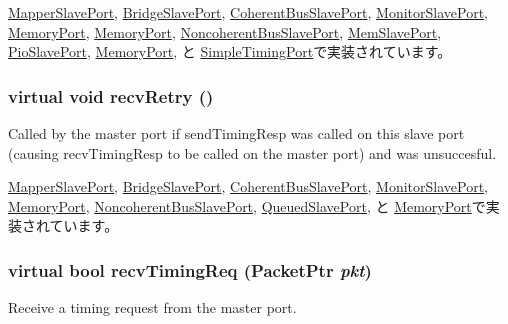 \hyperlink{classAddrMapper_1_1MapperSlavePort_aeefa907fb6d6a787e6dab90e8138ea90}{MapperSlavePort}, \hyperlink{classBridge_1_1BridgeSlavePort_aeefa907fb6d6a787e6dab90e8138ea90}{BridgeSlavePort}, \hyperlink{classCoherentBus_1_1CoherentBusSlavePort_a914924599c231593833dd1d527b4bb7c}{CoherentBusSlavePort}, \hyperlink{classCommMonitor_1_1MonitorSlavePort_aeefa907fb6d6a787e6dab90e8138ea90}{MonitorSlavePort}, \hyperlink{classDRAMCtrl_1_1MemoryPort_aeefa907fb6d6a787e6dab90e8138ea90}{MemoryPort}, \hyperlink{classDRAMSim2_1_1MemoryPort_aeefa907fb6d6a787e6dab90e8138ea90}{MemoryPort}, \hyperlink{classNoncoherentBus_1_1NoncoherentBusSlavePort_a914924599c231593833dd1d527b4bb7c}{NoncoherentBusSlavePort}, \hyperlink{classRubyPort_1_1MemSlavePort_aeefa907fb6d6a787e6dab90e8138ea90}{MemSlavePort}, \hyperlink{classRubyPort_1_1PioSlavePort_aeefa907fb6d6a787e6dab90e8138ea90}{PioSlavePort}, \hyperlink{classSimpleMemory_1_1MemoryPort_aeefa907fb6d6a787e6dab90e8138ea90}{MemoryPort}, と \hyperlink{classSimpleTimingPort_aeefa907fb6d6a787e6dab90e8138ea90}{SimpleTimingPort}で実装されています。\hypertarget{classSlavePort_ac1ccc3bcf7ebabb20b57fab99b2be5b0}{
\subsubsection[{recvRetry}]{\setlength{\rightskip}{0pt plus 5cm}virtual void recvRetry ()}}
\label{classSlavePort_ac1ccc3bcf7ebabb20b57fab99b2be5b0}
Called by the master port if sendTimingResp was called on this slave port (causing recvTimingResp to be called on the master port) and was unsuccesful. 

\hyperlink{classAddrMapper_1_1MapperSlavePort_a29cb5a4f98063ce6e9210eacbdb35298}{MapperSlavePort}, \hyperlink{classBridge_1_1BridgeSlavePort_a29cb5a4f98063ce6e9210eacbdb35298}{BridgeSlavePort}, \hyperlink{classCoherentBus_1_1CoherentBusSlavePort_a7ec461ad187b82b4b21e27c86e45cf9c}{CoherentBusSlavePort}, \hyperlink{classCommMonitor_1_1MonitorSlavePort_a29cb5a4f98063ce6e9210eacbdb35298}{MonitorSlavePort}, \hyperlink{classDRAMSim2_1_1MemoryPort_a29cb5a4f98063ce6e9210eacbdb35298}{MemoryPort}, \hyperlink{classNoncoherentBus_1_1NoncoherentBusSlavePort_a7ec461ad187b82b4b21e27c86e45cf9c}{NoncoherentBusSlavePort}, \hyperlink{classQueuedSlavePort_a7ec461ad187b82b4b21e27c86e45cf9c}{QueuedSlavePort}, と \hyperlink{classSimpleMemory_1_1MemoryPort_a29cb5a4f98063ce6e9210eacbdb35298}{MemoryPort}で実装されています。\hypertarget{classSlavePort_abcece77e42f88ee41af8d3d01bb48253}{
\subsubsection[{recvTimingReq}]{\setlength{\rightskip}{0pt plus 5cm}virtual bool recvTimingReq ({\bf PacketPtr} {\em pkt})}}
\label{classSlavePort_abcece77e42f88ee41af8d3d01bb48253}
Receive a timing request from the master port. 

